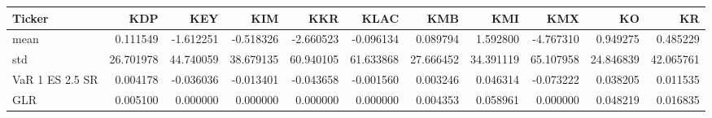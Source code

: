 \begin{tabular}{lrrrrrrrrrr}
\toprule
Ticker & KDP & KEY & KIM & KKR & KLAC & KMB & KMI & KMX & KO & KR \\
\midrule
mean & 0.111549 & -1.612251 & -0.518326 & -2.660523 & -0.096134 & 0.089794 & 1.592800 & -4.767310 & 0.949275 & 0.485229 \\
std & 26.701978 & 44.740059 & 38.679135 & 60.940105 & 61.633868 & 27.666452 & 34.391119 & 65.107958 & 24.846839 & 42.065761 \\
VaR 1%
ES 2.5%
SR & 0.004178 & -0.036036 & -0.013401 & -0.043658 & -0.001560 & 0.003246 & 0.046314 & -0.073222 & 0.038205 & 0.011535 \\
GLR & 0.005100 & 0.000000 & 0.000000 & 0.000000 & 0.000000 & 0.004353 & 0.058961 & 0.000000 & 0.048219 & 0.016835 \\
\bottomrule
\end{tabular}

